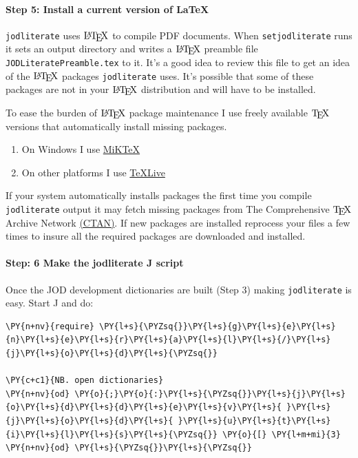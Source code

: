     \hypertarget{step-5-install-a-current-version-of-latex}{%
\paragraph{Step 5: Install a current version of
LaTeX}\label{step-5-install-a-current-version-of-latex}}

\texttt{jodliterate} uses \(\LaTeX\) to compile PDF documents. When
\texttt{setjodliterate} runs it sets an output directory and writes a
\(\LaTeX\) preamble file \texttt{JODLiteratePreamble.tex} to it. It's a
good idea to review this file to get an idea of the \(\LaTeX\) packages
\texttt{jodliterate} uses. It's possible that some of these packages are
not in your \(\LaTeX\) distribution and will have to be installed.

To ease the burden of \(\LaTeX\) package maintenance I use freely
available \(\TeX\) versions that automatically install missing packages.

\begin{enumerate}
\def\labelenumi{\arabic{enumi}.}
\tightlist
\item
  On Windows I use \href{https://miktex.org/}{MiKTeX}
\item
  On other platforms I use
  \href{https://en.wikipedia.org/wiki/TeX_Live}{TeXLive}
\end{enumerate}

If your system automatically installs packages the first time you
compile \texttt{jodliterate} output it may fetch missing packages from
The Comprehensive \(\TeX\) Archive Network
\href{https://www.ctan.org/}{(CTAN)}. If new packages are installed
reprocess your files a few times to insure all the required packages are
downloaded and installed.

    \hypertarget{step-6-make-the-jodliterate-j-script}{%
\paragraph{Step: 6 Make the jodliterate J
script}\label{step-6-make-the-jodliterate-j-script}}

Once the JOD development dictionaries are built (Step 3) making
\texttt{jodliterate} is easy. Start J and do:

    \begin{tcolorbox}[breakable, size=fbox, boxrule=1pt, pad at break*=1mm,colback=cellbackground, colframe=cellborder]
\begin{Verbatim}[commandchars=\\\{\}]
\PY{n+nv}{require} \PY{l+s}{\PYZsq{}}\PY{l+s}{g}\PY{l+s}{e}\PY{l+s}{n}\PY{l+s}{e}\PY{l+s}{r}\PY{l+s}{a}\PY{l+s}{l}\PY{l+s}{/}\PY{l+s}{j}\PY{l+s}{o}\PY{l+s}{d}\PY{l+s}{\PYZsq{}}

\PY{c+c1}{NB. open dictionaries}
\PY{n+nv}{od} \PY{o}{;}\PY{o}{:}\PY{l+s}{\PYZsq{}}\PY{l+s}{j}\PY{l+s}{o}\PY{l+s}{d}\PY{l+s}{d}\PY{l+s}{e}\PY{l+s}{v}\PY{l+s}{ }\PY{l+s}{j}\PY{l+s}{o}\PY{l+s}{d}\PY{l+s}{ }\PY{l+s}{u}\PY{l+s}{t}\PY{l+s}{i}\PY{l+s}{l}\PY{l+s}{s}\PY{l+s}{\PYZsq{}} \PY{o}{[} \PY{l+m+mi}{3} \PY{n+nv}{od} \PY{l+s}{\PYZsq{}}\PY{l+s}{\PYZsq{}}
\end{Verbatim}
\end{tcolorbox}

